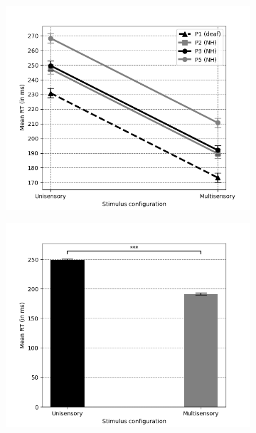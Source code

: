 \documentclass[12pt]{article}
\begin{document}
%
\begin{figure}[h!]
        \centering
        \begin{subfigure}[b]{0.475\textwidth}
            \centering
            \includegraphics[width=\textwidth]{Uni_Multi_lines.png}
            \caption[]%
            {{\small}}    
            \label{fig:4a}
        \end{subfigure}
        \hfill
        \begin{subfigure}[b]{0.475\textwidth}  
            \centering 
            \includegraphics[width=\textwidth]{Uni_Multi_bar.png}

\end{subfigure}
\end{figure}
\end{document}
